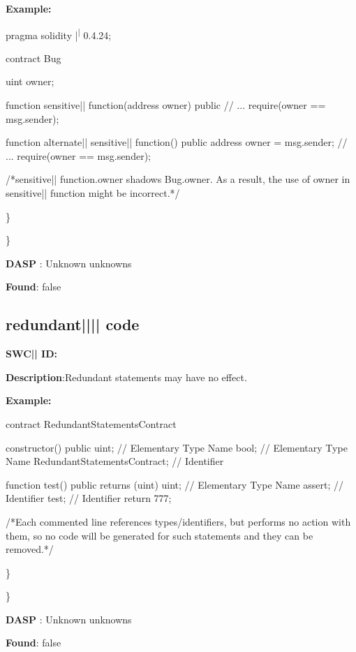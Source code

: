 \documentclass{article}
\begin{document}
\textbf{Example:} 
\begin{ffcode} 

pragma solidity |\textsuperscript| 0.4.24;

contract Bug {
    uint owner;

    function sensitive|\textunderscore| function(address owner) public {
        // ...
        require(owner == msg.sender);
    }

    function alternate|\textunderscore| sensitive|\textunderscore| function() public {
        address owner = msg.sender;
        // ...
        require(owner == msg.sender);
    }
}

 /*sensitive|\textunderscore| function.owner shadows Bug.owner. As a result, the use of owner in sensitive|\textunderscore| function might be incorrect.*/ 

\end{ffcode} 
\} 

\} 

\textbf{DASP} : Unknown unknowns

\textbf{Found}: false

\subsection{redundant{||\textunderscore|| }code} 
\textbf{SWC{|\textunderscore| }ID:} 

\textbf{Description}:Redundant statements may have no effect.


\textbf{Example:} 
\begin{ffcode} 

contract RedundantStatementsContract {

    constructor() public {
        uint; // Elementary Type Name
        bool; // Elementary Type Name
        RedundantStatementsContract; // Identifier
    }

    function test() public returns (uint) {
        uint; // Elementary Type Name
        assert; // Identifier
        test; // Identifier
        return 777;
    }
}

 /*Each commented line references types/identifiers, but performs no action with them, so no code will be generated for such statements and they can be removed.*/ 

\end{ffcode} 
\} 

\} 

\textbf{DASP} : Unknown unknowns

\textbf{Found}: false
\end{document}
